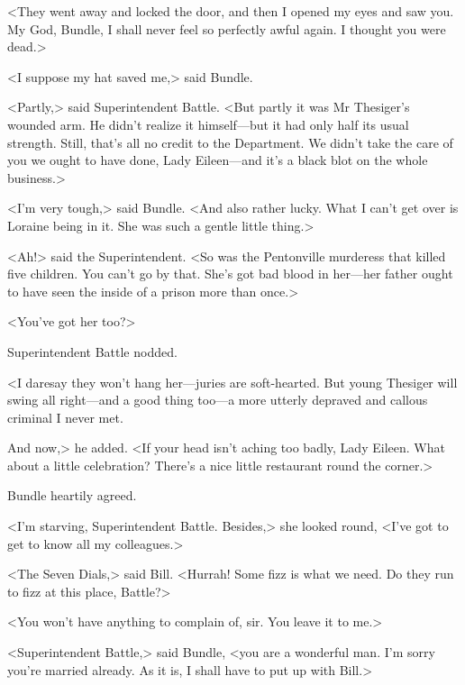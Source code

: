 <They went away and locked the door, and then I opened my eyes and saw you. My God, Bundle, I shall never feel so perfectly awful again. I thought you were dead.>

<I suppose my hat saved me,> said Bundle.

<Partly,> said Superintendent Battle. <But partly it was Mr Thesiger's wounded arm. He didn't realize it himself—but it had only half its usual strength. Still, that's all no credit to the Department. We didn't take the care of you we ought to have done, Lady Eileen—and it's a black blot on the whole business.>

<I'm very tough,> said Bundle. <And also rather lucky. What I can't get over is Loraine being in it. She was such a gentle little thing.>

<Ah!> said the Superintendent. <So was the Pentonville murderess that killed five children. You can't go by that. She's got bad blood in her—her father ought to have seen the inside of a prison more than once.>

<You've got her too?>

Superintendent Battle nodded.

<I daresay they won't hang her—juries are soft-hearted. But young Thesiger will swing all right—and a good thing too—a more utterly depraved and callous criminal I never met.

And now,> he added. <If your head isn't aching too badly, Lady Eileen. What about a little celebration? There's a nice little restaurant round the corner.>

Bundle heartily agreed.

<I'm starving, Superintendent Battle. Besides,> she looked round, <I've got to get to know all my colleagues.>

<The Seven Dials,> said Bill. <Hurrah! Some fizz is what we need. Do they run to fizz at this place, Battle?>

<You won't have anything to complain of, sir. You leave it to me.>

<Superintendent Battle,> said Bundle, <you are a wonderful man. I'm sorry you're married already. As it is, I shall have to put up with Bill.>
